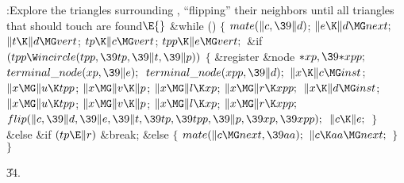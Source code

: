 \Y\B\4:Explore the triangles surrounding , ``flipping'' their
neighbors until all triangles that should touch  are found\X${}\E{}$\6
\&{while} ()\5
${}\{{}$\1\6
${}\\{mate}(\|c,\39\|d){}$;\5
${}\|e\K\|d\MG\\{next};{}$\6
${}\|t\K\|d\MG\\{vert}{}$;\5
${}\\{tp}\K\|c\MG\\{vert}{}$;\5
${}\\{tpp}\K\|e\MG\\{vert};{}$\6
\&{if} ${}(\\{tpp}\W\\{incircle}(\\{tpp},\39\\{tp},\39\|t,\39\|p)){}$\5
${}\{{}$\1\6
\&{register} \&{node} ${}{*}\\{xp},\39{*}\\{xpp};{}$\7
${}\\{terminal\_node}(\\{xp},\39\|e);{}$\6
${}\\{terminal\_node}(\\{xpp},\39\|d);{}$\6
${}\|x\K\|c\MG\\{inst}{}$;\5
${}\|x\MG\|u\K\\{tpp}{}$;\5
${}\|x\MG\|v\K\|p{}$;\5
${}\|x\MG\|l\K\\{xp}{}$;\5
${}\|x\MG\|r\K\\{xpp};{}$\6
${}\|x\K\|d\MG\\{inst}{}$;\5
${}\|x\MG\|u\K\\{tpp}{}$;\5
${}\|x\MG\|v\K\|p{}$;\5
${}\|x\MG\|l\K\\{xp}{}$;\5
${}\|x\MG\|r\K\\{xpp};{}$\6
${}\\{flip}(\|c,\39\|d,\39\|e,\39\|t,\39\\{tp},\39\\{tpp},\39\|p,\39\\{xp},\39%
\\{xpp});{}$\6
${}\|c\K\|e;{}$\6
\4${}\}{}$\2\6
\&{else} \&{if} ${}(\\{tp}\E\|r){}$\1\5
\&{break};\2\6
\&{else}\5
${}\{{}$\1\6
${}\\{mate}(\|c\MG\\{next},\39\\{aa});{}$\6
${}\|c\K\\{aa}\MG\\{next};{}$\6
\4${}\}{}$\2\6
\4${}\}{}$\2\par
\U34.\fi

